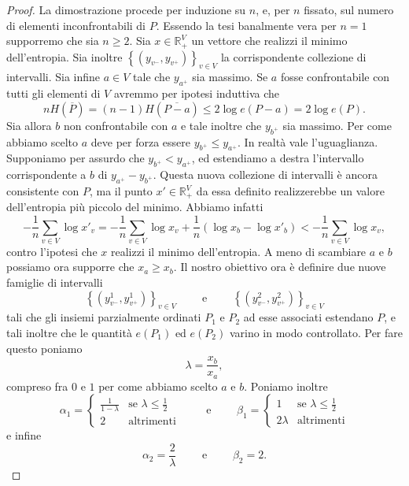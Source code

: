 \begin{proof}
	La dimostrazione procede per induzione su \(n\), e, per \(n\) fissato, sul numero di elementi inconfrontabili di \(P\). Essendo la tesi banalmente vera per \(n=1\) supporremo che sia \(n\ge 2\). Sia \(x\in \mathbb{R}_{+}^{V}\) un vettore che realizzi il minimo dell'entropia. Sia inoltre \(\left\{\left(y_{v^-},y_{v^+}\right)\right\}_{v\in V}\) la corrispondente collezione di intervalli. Sia infine \(a\in V\) tale che \(y_{a^+}\) sia massimo. Se \(a\) fosse confrontabile con tutti gli elementi di \(V\) avremmo per ipotesi induttiva che
	\[nH\left(\overline{P}\right)=(n-1)H\left(\overline{P-a}\right)\le 2\log{e(P-a)=2\log{e(P)}}.\]
	Sia allora \(b\) non confrontabile con \(a\) e tale inoltre che \(y_{b^+}\) sia massimo. Per come abbiamo scelto \(a\) deve per forza essere \(y_{b^+}\le y_{a^+}\). In realtà vale l'uguaglianza. Supponiamo per assurdo che \(y_{b^+}<y_{a^+}\), ed estendiamo a destra l'intervallo corrispondente a \(b\) di \(y_{a^+}-y_{b^+}\). Questa nuova collezione di intervalli è ancora consistente con \(P\), ma il punto \(x'\in \mathbb{R}_{+}^{V}\) da essa definito realizzerebbe un valore dell'entropia più piccolo del minimo. Abbiamo infatti
	\[-\frac{1}{n}\sum_{v\in V}{\log{x'_{v}}}=-\frac{1}{n}\sum_{v\in V}{\log{x_{v}}}+\frac{1}{n}\left(\log{x_b}-\log{x'_{b}}\right)<-\frac{1}{n}\sum_{v\in V}{\log{x_v}},\]
	contro l'ipotesi che \(x\) realizzi il minimo dell'entropia. A meno di scambiare \(a\) e \(b\) possiamo ora supporre che \(x_a\ge x_b\). Il nostro obiettivo ora è definire due nuove famiglie di intervalli
	\[\left\{\left(y_{v^-}^1, y_{v^+}^1\right)\right\}_{v\in V}\qquad\mbox{ e }\qquad\left\{\left(y_{v^-}^2, y_{v^+}^2\right)\right\}_{v\in V}\]
	tali che gli insiemi parzialmente ordinati \(P_1\) e \(P_2\) ad esse associati estendano \(P\), e tali inoltre che le quantità \(e(P_1)\) ed \(e(P_2)\) varino in modo controllato. Per fare questo poniamo
	\[\lambda=\frac{x_b}{x_a},\]
	compreso fra \(0\) e \(1\) per come abbiamo scelto \(a\) e \(b\). Poniamo inoltre
	\[\alpha_1= 
	\begin{cases}
		\frac{1}{1-\lambda} & \mbox{se } \lambda\le\frac{1}{2} \\
		2 & \mbox{altrimenti} 
	\end{cases}
	\qquad\mbox{ e }\qquad \beta_1= 
	\begin{cases}
		1 & \mbox{se } \lambda\le\frac{1}{2} \\
		2\lambda & \mbox{altrimenti} 
	\end{cases}
	\]
	e infine
	\[\alpha_2=\frac{2}{\lambda}\qquad\mbox{ e }\qquad\beta_2=2.\]

\end{proof}
